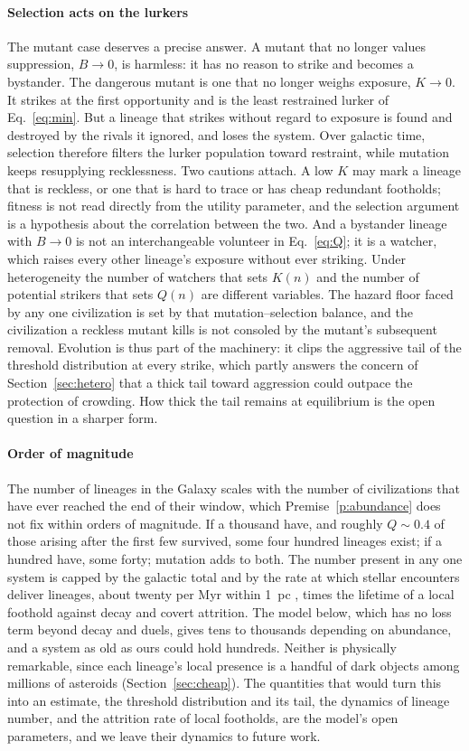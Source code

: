 \documentclass[preprint,12pt]{elsarticle}
\theoremstyle{definition}
\begin{document}
\paragraph{Selection acts on the lurkers}
The mutant case deserves a precise answer. A mutant that no longer values suppression, $B \to 0$, is harmless: it has no reason to strike and becomes a bystander. The dangerous mutant is one that no longer weighs exposure, $K \to 0$. It strikes at the first opportunity and is the least restrained lurker of Eq.~\eqref{eq:min}. But a lineage that strikes without regard to exposure is found and destroyed by the rivals it ignored, and loses the system. Over galactic time, selection therefore filters the lurker population toward restraint, while mutation keeps resupplying recklessness. Two cautions attach. A low $K$ may mark a lineage that is reckless, or one that is hard to trace or has cheap redundant footholds; fitness is not read directly from the utility parameter, and the selection argument is a hypothesis about the correlation between the two. And a bystander lineage with $B \to 0$ is not an interchangeable volunteer in Eq.~\eqref{eq:Q}; it is a watcher, which raises every other lineage's exposure without ever striking. Under heterogeneity the number of watchers that sets $K(n)$ and the number of potential strikers that sets $Q(n)$ are different variables. The hazard floor faced by any one civilization is set by that mutation--selection balance, and the civilization a reckless mutant kills is not consoled by the mutant's subsequent removal. Evolution is thus part of the machinery: it clips the aggressive tail of the threshold distribution at every strike, which partly answers the concern of Section~\ref{sec:hetero} that a thick tail toward aggression could outpace the protection of crowding. How thick the tail remains at equilibrium is the open question in a sharper form.

\paragraph{Order of magnitude}
The number of lineages in the Galaxy scales with the number of civilizations that have ever reached the end of their window, which Premise~\ref{p:abundance} does not fix within orders of magnitude. If a thousand have, and roughly $Q \sim 0.4$ of those arising after the first few survived, some four hundred lineages exist; if a hundred have, some forty; mutation adds to both. The number present in any one system is capped by the galactic total and by the rate at which stellar encounters deliver lineages, about twenty per Myr within 1~pc \citep{BailerJones2018}, times the lifetime of a local foothold against decay and covert attrition. The model below, which has no loss term beyond decay and duels, gives tens to thousands depending on abundance, and a system as old as ours could hold hundreds. Neither is physically remarkable, since each lineage's local presence is a handful of dark objects among millions of asteroids (Section~\ref{sec:cheap}). The quantities that would turn this into an estimate, the threshold distribution and its tail, the dynamics of lineage number, and the attrition rate of local footholds, are the model's open parameters, and we leave their dynamics to future work.
\end{document}
